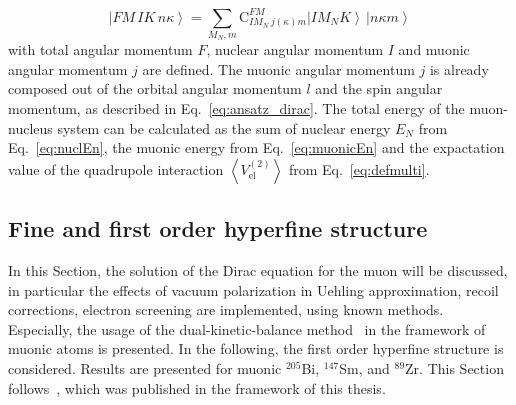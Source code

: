 \begin{equation}
\label{eq:totalState}
\left| FM\,IK\,n\kappa\right> = \sum_{M_N, m}\text{C}^{FM}_{IM_N\,j(\kappa)m}\left|IM_NK\right>\,\left|n\kappa m\right>
\end{equation}
with total angular momentum $F$, nuclear angular momentum $I$ and muonic angular momentum $j$ are defined. The muonic angular momentum $j$ is already composed out of the orbital angular momentum $l$ and the spin angular momentum, as described in Eq.~\eqref{eq:ansatz_dirac}. The total energy of the muon-nucleus system can be calculated as the sum of nuclear energy $E_N$ from Eq.~\eqref{eq:nuclEn}, the muonic energy from Eq.~\eqref{eq:muonicEn} and the expactation value of the quadrupole interaction $\left<V_{\text{el}}^{(2)}\right>$ from Eq.~\eqref{eq:defmulti}.

\subsection{Fine and first order hyperfine structure}
\label{sec:muon_finestructure}
In this Section, the solution of the Dirac equation for the muon will be discussed, in particular the effects of vacuum polarization in Uehling approximation, recoil corrections, electron screening are implemented, using known methods. Especially, the usage of the dual-kinetic-balance method~\cite{Shabaev2004} in the framework of muonic atoms is presented. In the following, the first order hyperfine structure is considered. Results are presented for muonic $^{205}$Bi, $^{147}$Sm, and $^{89}$Zr. This Section follows~\cite{michel2017}, which was published in the framework of this thesis.


